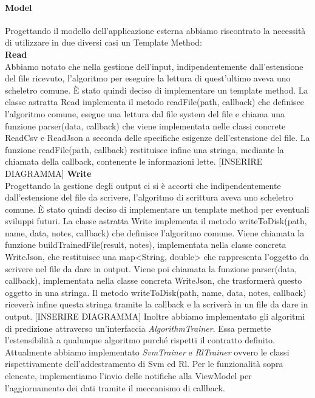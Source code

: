 			\paragraph{Model}
			Progettando il modello dell'applicazione esterna abbiamo riscontrato la necessità di utilizzare in due diversi casi un Template Method: \\
			\textbf{Read} \mbox{} \\ 
			Abbiamo notato che nella gestione dell'input, indipendentemente dall'estensione del file ricevuto, l'algoritmo per eseguire la lettura di quest'ultimo aveva uno scheletro comune. È stato quindi deciso di implementare un template method. La classe astratta Read implementa il metodo readFile(path, callback) che definisce l'algoritmo comune, esegue una lettura dal file system del file e chiama una funzione parser(data, callback) che viene implementata nelle classi concrete ReadCsv e ReadJson a seconda delle specifiche esigenze dell'estensione del file. La funzione readFile(path, callback) restituisce infine una stringa, mediante la chiamata della callback, contenente le informazioni lette. 
			[INSERIRE DIAGRAMMA]
			\textbf{Write} \mbox{} \\ 
			Progettando la gestione degli output ci si è accorti che indipendentemente dall'estensione del file da scrivere, l'algoritmo di scrittura aveva uno scheletro comune. È stato quindi deciso di implementare un template method per eventuali sviluppi futuri. La classe astratta Write implementa il metodo writeToDisk(path, name, data, notes, callback) che definisce l'algoritmo comune. Viene chiamata la funzione buildTrainedFile(result, notes), implementata nella classe concreta WriteJson, che restituisce una map<String, double> che rappresenta l'oggetto da scrivere nel file da dare in output. Viene poi chiamata la funzione parser(data, callback), implementata nella classe concreta WriteJson, che trasformerà questo oggetto in una stringa. Il metodo writeToDisk(path, name, data, notes, callback) riceverà infine questa stringa tramite la callback e la scriverà in un file da dare in output.
			[INSERIRE DIAGRAMMA]
			Inoltre abbiamo implementato gli algoritmi di predizione attraverso un'interfaccia \textit{AlgorithmTrainer}. Essa permette l'estensibilità a qualunque algoritmo purché rispetti il contratto definito. Attualmente abbiamo implementato \textit{SvmTrainer} e \textit{RlTrainer} ovvero le classi rispettivamente dell'addestramento di Svm ed Rl.
			Per le funzionalità sopra elencate, implementiamo l'invio delle notifiche alla ViewModel per l'aggiornamento dei dati tramite il meccanismo di callback.			
